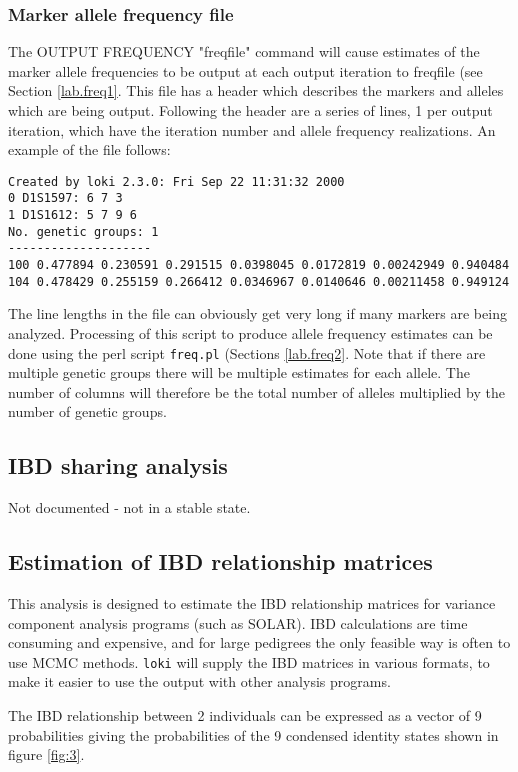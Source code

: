 \documentclass[10pt,a4paper]{article}
\newcommand{\Loki}{\texttt{loki}\xspace}
\begin{document}
\subsubsection{Marker allele frequency file}
\label{lab.freq}
The OUTPUT FREQUENCY "freqfile" command will cause estimates of the marker
allele frequencies to be output at each output iteration to freqfile (see
Section \ref{lab.freq1}.  This file has a header which describes the markers
and alleles which are being output.  Following the header are a series of
lines, 1 per output iteration, which have the iteration number and allele
frequency realizations.  An example of the file follows:
\begin{verbatim}
Created by loki 2.3.0: Fri Sep 22 11:31:32 2000
0 D1S1597: 6 7 3
1 D1S1612: 5 7 9 6
No. genetic groups: 1
--------------------
100 0.477894 0.230591 0.291515 0.0398045 0.0172819 0.00242949 0.940484
104 0.478429 0.255159 0.266412 0.0346967 0.0140646 0.00211458 0.949124
\end{verbatim}
The line lengths in the file can obviously get very long if many markers are
being analyzed.  Processing of this script to produce allele frequency
estimates can be done using the perl script \verb+freq.pl+ (Sections
\ref{lab.freq2}.  Note that if there are multiple genetic groups there will
be multiple estimates for each allele.  The number of columns will therefore
be the total number of alleles multiplied by the number of genetic groups.
\subsection{IBD sharing analysis}\label{ibd_analysis}
Not documented - not in a stable state.

\subsection{Estimation of IBD relationship matrices}\label{ibd_estimation}
This analysis is designed to estimate the IBD relationship matrices for
variance component analysis programs (such as SOLAR).  IBD calculations are
time consuming and expensive, and for large pedigrees the only feasible way
is often to use MCMC methods.  \Loki will supply the IBD matrices in various
formats, to make it easier to use the output with other analysis programs.

The IBD relationship between 2 individuals can be expressed as a vector of 9
probabilities giving the probabilities of the 9 condensed identity
states shown in figure \ref{fig:3}.
\end{document}
